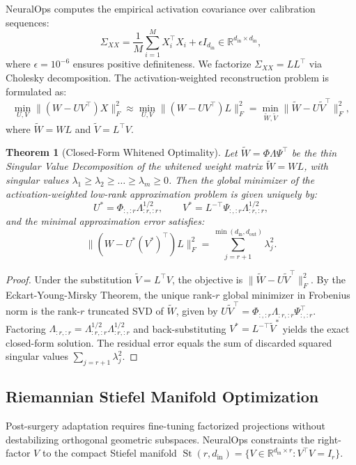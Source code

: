 \documentclass{article}
\newtheorem{theorem}{Theorem}
\begin{document}
NeuralOps computes the empirical activation covariance over calibration sequences:
\begin{equation}
    \Sigma_{XX} = \frac{1}{M} \sum_{i=1}^M X_i^\top X_i + \epsilon I_{d_{\text{in}}} \in \mathbb{R}^{d_{\text{in}} \times d_{\text{in}}},
\end{equation}
where $\epsilon = 10^{-6}$ ensures positive definiteness. We factorize $\Sigma_{XX} = L L^\top$ via Cholesky decomposition. The activation-weighted reconstruction problem is formulated as:
\begin{equation}
    \min_{U, V} \|(W - U V^\top) X\|_F^2 \approx \min_{U, V} \|(W - U V^\top) L\|_F^2 = \min_{\tilde{W}, \tilde{V}} \|\tilde{W} - U \tilde{V}^\top\|_F^2,
\end{equation}
where $\tilde{W} = W L$ and $\tilde{V} = L^\top V$. 

\begin{theorem}[Closed-Form Whitened Optimality]
\label{thm:whitening_opt}
Let $\tilde{W} = \Phi \Lambda \Psi^\top$ be the thin Singular Value Decomposition of the whitened weight matrix $\tilde{W} = W L$, with singular values $\lambda_1 \ge \lambda_2 \ge \dots \ge \lambda_m \ge 0$. Then the global minimizer of the activation-weighted low-rank approximation problem is given uniquely by:
\begin{equation}
    U^* = \Phi_{:, :r} \Lambda_{:r, :r}^{1/2}, \qquad V^* = L^{-\top} \Psi_{:, :r} \Lambda_{:r, :r}^{1/2},
\end{equation}
and the minimal approximation error satisfies:
\begin{equation}
    \|(W - U^* (V^*)^\top) L\|_F^2 = \sum_{j=r+1}^{\min(d_{\text{in}}, d_{\text{out}})} \lambda_j^2.
\end{equation}
\end{theorem}
\begin{proof}
Under the substitution $\tilde{V} = L^\top V$, the objective is $\|\tilde{W} - U \tilde{V}^\top\|_F^2$. By the Eckart-Young-Mirsky Theorem, the unique rank-$r$ global minimizer in Frobenius norm is the rank-$r$ truncated SVD of $\tilde{W}$, given by $U \tilde{V}^\top = \Phi_{:, :r} \Lambda_{:r, :r} \Psi_{:, :r}^\top$. Factoring $\Lambda_{:r, :r} = \Lambda_{:r, :r}^{1/2} \Lambda_{:r, :r}^{1/2}$ and back-substituting $V^* = L^{-\top} \tilde{V}^*$ yields the exact closed-form solution. The residual error equals the sum of discarded squared singular values $\sum_{j=r+1} \lambda_j^2$.
\end{proof}

\subsection{Riemannian Stiefel Manifold Optimization}
Post-surgery adaptation requires fine-tuning factorized projections without destabilizing orthogonal geometric subspaces. NeuralOps constraints the right-factor $V$ to the compact Stiefel manifold $\operatorname{St}(r, d_{\text{in}}) = \{V \in \mathbb{R}^{d_{\text{in}} \times r} : V^\top V = I_r\}$.
\end{document}

